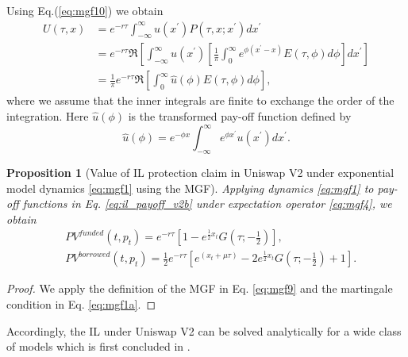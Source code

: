 \documentclass[pdftex,11pt,a4paper] {article}
\newtheorem{proposition}{Proposition}[section]
\begin{document}
Using Eq.(\ref{eq:mgf10}) we obtain
\begin{equation}  \label{eq:mgf_pricing}
\begin{split}
U(\tau, x) &=e^{-r\tau} \int^{\infty}_{-\infty}u(x^{\prime })P(\tau,x;
x^{\prime })dx^{\prime } \\
&=e^{-r\tau}\Re\left[ \int^{\infty}_{-\infty}u(x^{\prime })\left[\frac{1}{\pi%
} \int^{\infty}_{0}e^{\phi (x^{\prime }-x)} E(\tau,\phi)d\phi\right]%
dx^{\prime }\right] \\
& = \frac{1}{\pi} e^{-r \tau} \Re\left[\int^{\infty}_{0}\widehat{u}%
(\phi)E(\tau,\phi)d\phi\right],
\end{split}%
\end{equation}
where we assume that the inner integrals are finite to exchange the order of
the integration. Here $\widehat{u}(\phi)$ is the transformed pay-off function
defined by
\begin{equation}  \label{eq:mgf13}
\widehat{u}(\phi) = e^{-\phi x}\int^{\infty}_{-\infty}e^{\phi x^{\prime }}
u(x^{\prime }) dx^{\prime }.
\end{equation}

\begin{proposition}[Value of IL protection claim in Uniswap V2 under
exponential model dynamics \eqref{eq:mgf1} using the MGF]
\label{prop:bs_v2v} Applying dynamics \eqref{eq:mgf1} to pay-off functions in
Eq. \eqref{eq:il_payoff_v2b} under expectation operator \eqref{eq:mgf4}, we
obtain
\begin{equation}  \label{eq:il_payoff_v2_mgf}
\begin{split}
& PV^{funded}(t,p_{t}) = e^{-r \tau}\left[ 1 - e^{ \frac{1}{2} x_{t}} G
\left( \tau; -\frac{1}{2}\right) \right], \\
& PV^{borrowed}(t,p_{t}) = \frac{1}{2} e^{-r \tau} \left[ e^{(x_{t}
+\mu\tau)} - 2e^{ \frac{1}{2} x_{t}} G\left(\tau;-\frac{1}{2}\right) + 1%
\right].
\end{split}%
\end{equation}
\end{proposition}

\begin{proof}
We apply the definition of the MGF in Eq. \eqref{eq:mgf9} and the martingale condition in Eq. \eqref{eq:mgf1a}.
\end{proof}Accordingly, the IL under Uniswap V2 can be solved analytically
for a wide class of models which is first concluded in \citet{Lipton2024}.
\end{document}
